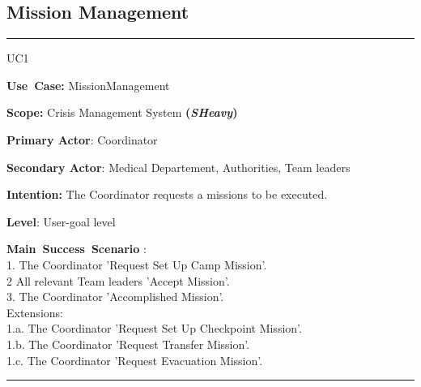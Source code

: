 \subsection{Mission Management}
\vspace{0.5cm}
\hrule
\vspace{0.5cm}
\begin{lyxlist}{UC1}
\small{
\item [\textbf{Use~Case:}] MissionManagement
\item [\textbf{Scope:}] Crisis Management System \textbf{(\emph{SHeavy})}
\item [\textbf{Primary Actor}:] Coordinator
\item [\textbf{Secondary Actor}:] Medical Departement, Authorities, Team leaders
\item [\textbf{Intention:}]The Coordinator requests a missions to be executed.
\item [\textbf{Level}:]User-goal level
\item [\textbf{Main~Success~Scenario}]:\\
1. The Coordinator 'Request Set Up Camp Mission'.\\
2  All relevant Team leaders 'Accept Mission'.\\
3. The Coordinator 'Accomplished Mission'.\\
Extensions:\\
	1.a. The Coordinator 'Request Set Up Checkpoint Mission'.\\
	1.b. The Coordinator 'Request Transfer Mission'.\\
	1.c. The Coordinator 'Request Evacuation Mission'.\\
}
\end{lyxlist}
\hrule 
\vspace{0.5cm} 

